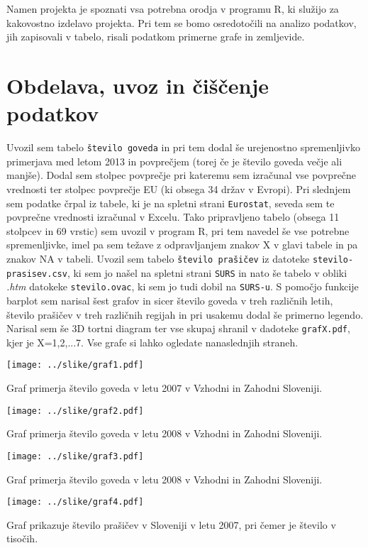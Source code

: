 \documentclass[11pt,a4paper]{article}
\begin{document}
Namen projekta je spoznati vsa potrebna orodja v programu R, ki služijo za kakovostno izdelavo projekta. Pri tem se bomo osredotočili na analizo podatkov, jih zapisovali v tabelo, risali podatkom primerne grafe in zemljevide.

\section{Obdelava, uvoz in čiščenje podatkov}
Uvozil sem tabelo \verb|število goveda| in pri tem dodal še urejenostno spremenljivko primerjava med letom 2013 in povprečjem (torej če je število goveda večje ali manjše). Dodal sem stolpec povprečje pri kateremu sem izračunal vse povprečne vrednosti ter stolpec povprečje EU (ki obsega 34 držav v Evropi). Pri slednjem sem podatke črpal iz tabele, ki je na spletni strani \verb|Eurostat|, seveda sem te povprečne vrednosti izračunal v Excelu. Tako pripravljeno tabelo (obsega 11 stolpcev in 69 vrstic) sem uvozil v program R, pri tem navedel še vse potrebne spremenljivke, imel pa sem težave z odpravljanjem znakov X v glavi tabele in pa znakov NA v tabeli.
Uvozil sem tabelo \verb|število prašičev| iz datoteke \verb|stevilo-prasisev.csv|, ki sem jo našel na spletni strani \verb|SURS| in nato še tabelo v obliki \textit{.htm} datokeke \verb|stevilo.ovac|, ki sem jo tudi dobil na \verb|SURS-u|.
S pomočjo funkcije barplot sem narisal šest grafov in sicer število goveda v treh različnih letih, število prašičev v treh različnih regijah in pri usakemu dodal še primerno legendo. Narisal sem še 3D tortni diagram ter vse skupaj shranil v dadoteke \verb|grafX.pdf|, kjer je X={1,2,...7}. Vse grafe si lahko ogledate nanaslednjih straneh.


\texttt{[image: ../slike/graf1.pdf]}

Graf primerja število goveda v letu 2007 v Vzhodni in Zahodni Sloveniji.


\texttt{[image: ../slike/graf2.pdf]}

Graf primerja število goveda v letu 2008 v Vzhodni in Zahodni Sloveniji.

\texttt{[image: ../slike/graf3.pdf]}

Graf primerja število goveda v letu 2008 v Vzhodni in Zahodni Sloveniji.

\texttt{[image: ../slike/graf4.pdf]}

Graf prikazuje število prašičev v Sloveniji v letu 2007, pri čemer je število v tisočih.
\end{document}
